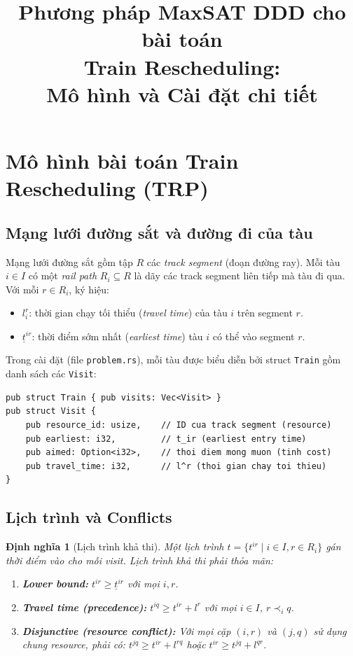\documentclass[11pt,a4paper]{article}
\title{Phương pháp MaxSAT DDD cho bài toán\\Train Rescheduling:\\Mô hình và Cài đặt chi tiết}
\author{}
\date{}
\newtheorem{definition}{Định nghĩa}
\begin{document}
\maketitle
\tableofcontents
\newpage

\section{Mô hình bài toán Train Rescheduling (TRP)}

\subsection{Mạng lưới đường sắt và đường đi của tàu}

Mạng lưới đường sắt gồm tập $R$ các \emph{track segment} (đoạn đường ray). Mỗi tàu $i \in I$ có một \emph{rail path} $R_i \subseteq R$ là dãy các track segment liên tiếp mà tàu đi qua. Với mỗi $r \in R_i$, ký hiệu:
\begin{itemize}
  \item $l^r_i$: thời gian chạy tối thiểu (\emph{travel time}) của tàu $i$ trên segment $r$.
  \item $\underline{t}^{ir}$: thời điểm sớm nhất (\emph{earliest time}) tàu $i$ có thể vào segment $r$.
\end{itemize}

Trong cài đặt (file \texttt{problem.rs}), mỗi tàu được biểu diễn bởi struct \texttt{Train} gồm danh sách các \texttt{Visit}:
\begin{verbatim}
pub struct Train { pub visits: Vec<Visit> }
pub struct Visit {
    pub resource_id: usize,    // ID cua track segment (resource)
    pub earliest: i32,         // t_ir (earliest entry time)
    pub aimed: Option<i32>,    // thoi diem mong muon (tinh cost)
    pub travel_time: i32,      // l^r (thoi gian chay toi thieu)
}
\end{verbatim}

\subsection{Lịch trình và Conflicts}

\begin{definition}[Lịch trình khả thi]
Một \emph{lịch trình} $t = \{t^{ir} \mid i \in I, r \in R_i\}$ gán thời điểm vào cho mỗi visit. Lịch trình khả thi phải thỏa mãn:
\begin{enumerate}[label=(\roman*)]
  \item \textbf{Lower bound:} $t^{ir} \geq \underline{t}^{ir}$ với mọi $i, r$.
  \item \textbf{Travel time (precedence):} $t^{iq} \geq t^{ir} + l^r$ với mọi $i \in I$, $r \prec_i q$.
  \item \textbf{Disjunctive (resource conflict):} Với mọi cặp $(i,r)$ và $(j,q)$ sử dụng chung resource, phải có: $t^{jq} \geq t^{ir} + l^{rq}$ hoặc $t^{ir} \geq t^{jq} + l^{qr}$.
\end{enumerate}
\end{definition}
\end{document}
